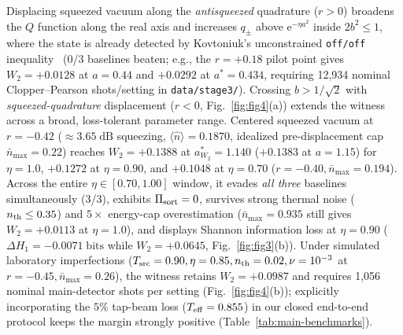 \documentclass{iopjournal}
\newcommand{\nbar}{\bar n_{\max}}
\newcommand{\ee}{\mathrm{e}}
\begin{document}
Displacing squeezed vacuum along the \emph{antisqueezed} quadrature ($r > 0$) broadens the $Q$ function along the real axis and increases $q_\pm$ above $\ee^{-\eta a^2}$ inside $2b^2 \le 1$, where the state is already detected by Kovtoniuk's unconstrained \texttt{off/off} inequality~\cite{Kovtoniuk2024} (0/3 baselines beaten; e.g., the $r = +0.18$ pilot point gives $W_2 = +0.0128$ at $a = 0.44$ and $+0.0292$ at $a^* = 0.434$, requiring 12,934 nominal Clopper--Pearson shots/setting in \texttt{data/stage3/}). Crossing $b > 1/\sqrt{2}$ with \emph{squeezed-quadrature} displacement ($r < 0$, Fig.~\ref{fig:fig4}(a)) extends the witness across a broad, loss-tolerant parameter range. Centered squeezed vacuum at $r = -0.42$ ($\approx 3.65\;\mathrm{dB}$ squeezing, $\langle\hat n\rangle = 0.1870$, idealized pre-displacement cap $\nbar = 0.22$) reaches $W_2 = +0.1388$ at $a^*_{W_2} = 1.140$ ($+0.1383$ at $a = 1.15$) for $\eta = 1.0$, $+0.1272$ at $\eta = 0.90$, and $+0.1048$ at $\eta = 0.70$ ($r = -0.40, \nbar = 0.194$). Across the entire $\eta \in [0.70, 1.00]$ window, it evades \emph{all three} baselines simultaneously (3/3), exhibits $\Pi_{\rm sort} = 0$, survives strong thermal noise ($n_{\rm th} \le 0.35$) and $5\times$ energy-cap overestimation ($\nbar = 0.935$ still gives $W_2 = +0.0113$ at $\eta = 1.0$), and displays Shannon information loss at $\eta = 0.90$ ($\Delta H_1 = -0.0071\;\mathrm{bits}$ while $W_2 = +0.0645$, Fig.~\ref{fig:fig3}(b)). Under simulated laboratory imperfections ($T_{\rm src} = 0.90, \eta = 0.85, n_{\rm th} = 0.02, \nu = 10^{-3}$ at $r = -0.45, \nbar = 0.26$), the witness retains $W_2 = +0.0987$ and requires 1,056 nominal main-detector shots per setting (Fig.~\ref{fig:fig4}(b)); explicitly incorporating the $5\%$ tap-beam loss ($T_{\rm eff} = 0.855$) in our closed end-to-end protocol keeps the margin strongly positive (Table~\ref{tab:main-benchmarks}).
\end{document}
